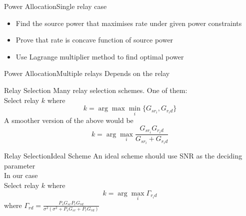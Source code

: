 \documentclass{beamer}
\begin{document}
\begin{frame}{Power Allocation}{Single relay case}
	\vspace{1cm}
	\begin{itemize}  
  \item
	  Find the source power that maximises rate under given power constraints
  \vspace{1cm}
  \pause
  \item Prove that rate is concave function of source power
  \pause
  \vspace{1cm}
  \item Use Lagrange multiplier method to find optimal power 	

	\end{itemize}
\end{frame}

\begin{frame}{Power Allocation}{Multiple relays}
	\vspace{-1cm}
	Depends on the relay
\end{frame}

\begin{frame}{Relay Selection}
	\vspace{-1cm}
Many relay selection schemes. One of them: \\ 
	\vspace{1cm}
	Select relay $k$
where 
	\begin{equation*}
		k = \arg \max\min\limits_{i} \{ G_{sr_i},G_{r_id} \} 
	\end{equation*}
	\pause
	A smoother version of the above would be
	\begin{equation*}
		k = \arg \max\limits_{i} \frac{ G_{sr_i}G_{r_id} }{ G_{sr_i}+G_{r_id} } 
	\end{equation*}
	
\end{frame}

\begin{frame}{Relay Selection}{Ideal Scheme}
	\vspace{-1cm}
	An ideal scheme should use SNR as the deciding parameter \\
	In our case \\
Select relay $k$
where 
	\begin{equation*}
		k = \arg \max\limits_{i} \Gamma_{r_id}
	\end{equation*}
	where $\Gamma_{rd} = \frac {P_s G_{sr} P_r G_{rd}}{\sigma^2(\sigma^2 + P_sG_{sr} + P_rG_{rd})}$	
\end{frame}
\end{document}
